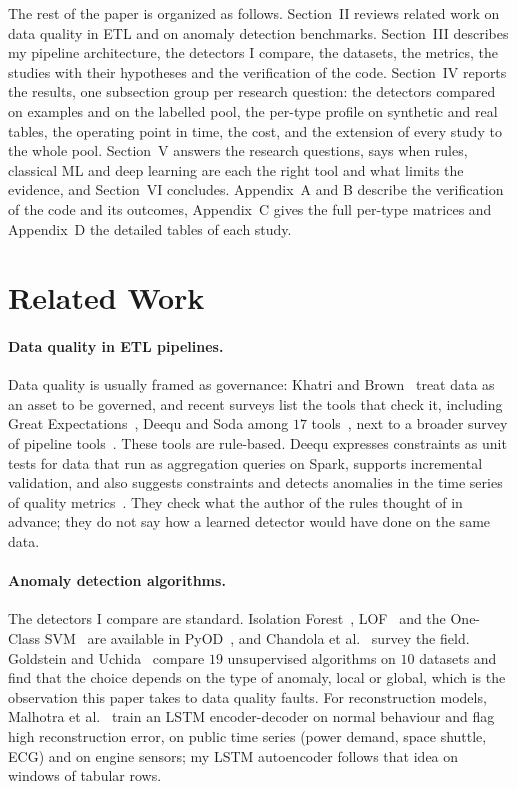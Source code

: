 \documentclass[conference]{IEEEtran}
\begin{document}
The rest of the paper is organized as follows. Section~II reviews
related work on data quality in ETL and on anomaly detection
benchmarks. Section~III describes my pipeline architecture, the
detectors I compare, the datasets, the metrics, the studies with their
hypotheses and the verification of the code. Section~IV reports the results, one
subsection group per research question: the detectors compared on examples and on the labelled
pool, the per-type profile on synthetic and real tables, the operating point in time, the cost, and
the extension of every study to the whole pool.
Section~V answers the research questions, says when rules, classical ML and
deep learning are each the right tool and what limits the evidence, and
Section~VI concludes. Appendix~A and B describe the verification of the
code and its outcomes, Appendix~C gives the full per-type matrices and Appendix~D the detailed
tables of each study.

\section{Related Work}
\label{sec:related}

\paragraph{Data quality in ETL pipelines.}
Data quality is usually framed as governance: Khatri and
Brown~\cite{khatri2010data} treat data as an asset to be governed, and recent
surveys list the tools that check it, including Great
Expectations~\cite{greatexpectations}, Deequ and Soda among $17$
tools~\cite{dataqualitysurvey2024}, next to a broader survey of pipeline
tools~\cite{pipelinetoolssurvey2024}. These tools are rule-based. Deequ
expresses constraints as unit tests for data that run as aggregation queries on
Spark, supports incremental validation, and also suggests constraints and
detects anomalies in the time series of quality metrics~\cite{schelter2018automating}.
They check what the author of the rules thought of in advance; they do not say
how a learned detector would have done on the same data.

\paragraph{Anomaly detection algorithms.}
The detectors I compare are standard. Isolation
Forest~\cite{liu2008isolation}, LOF~\cite{breunig2000lof} and the One-Class
SVM~\cite{scholkopf2001support} are available in
PyOD~\cite{zhao2019pyod}, and Chandola et al.~\cite{chandola2009anomaly} survey
the field. Goldstein and Uchida~\cite{goldstein2016comparative} compare $19$
unsupervised algorithms on $10$ datasets and find that the choice depends on
the type of anomaly, local or global, which is the observation this paper takes
to data quality faults. For reconstruction models, Malhotra et
al.~\cite{malhotra2016lstm} train an LSTM encoder-decoder on normal behaviour
and flag high reconstruction error, on public time series (power demand, space
shuttle, ECG) and on engine sensors; my LSTM autoencoder follows that idea on windows of tabular rows.
\end{document}

